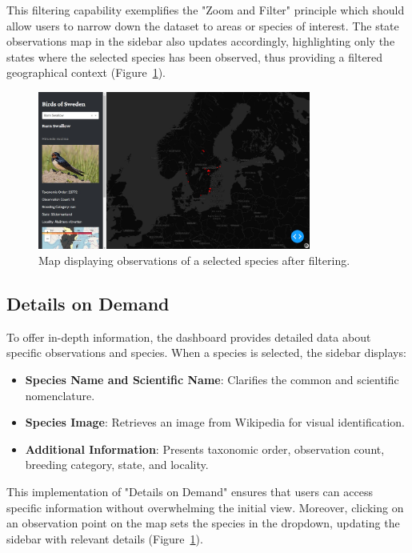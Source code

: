 This filtering capability exemplifies the "Zoom and Filter" principle which should allow users to narrow down the dataset to areas or species of interest. The state observations map in the sidebar also updates accordingly, highlighting only the states where the selected species has been observed, thus providing a filtered geographical context (Figure~\ref{fig:filtered_map}).

\begin{figure}[h] 
    \centering 
    \includegraphics[width=0.8\textwidth]{figures/species_details.jpg} 
    \caption{Map displaying observations of a selected species after filtering.} 
    \label{fig:filtered_map} 
\end{figure}

\subsection{Details on Demand}

To offer in-depth information, the dashboard provides detailed data about specific observations and species. When a species is selected, the sidebar displays:

\begin{itemize}
    \item \textbf{Species Name and Scientific Name}: Clarifies the common and scientific nomenclature. 
    \item \textbf{Species Image}: Retrieves an image from Wikipedia for visual identification. 
    \item \textbf{Additional Information}: Presents taxonomic order, observation count, breeding category, state, and locality. 
\end{itemize}

This implementation of "Details on Demand" ensures that users can access specific information without overwhelming the initial view. Moreover, clicking on an observation point on the map sets the species in the dropdown, updating the sidebar with relevant details (Figure~\ref{fig:filtered_map}).

